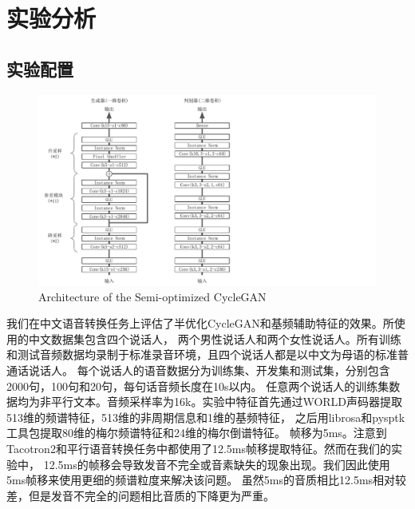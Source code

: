 \section{实验分析}
\subsection{实验配置}

\begin{figure}[!htp]
    \centering
    \includegraphics[width=12cm,trim=0 0 250 0,clip]{figure/4_networks.pdf}
    {Architecture of the Semi-optimized CycleGAN}
    \label{fig:networks}
\end{figure}

我们在中文语音转换任务上评估了半优化CycleGAN和基频辅助特征的效果。所使用的中文数据集包含四个说话人，
两个男性说话人和两个女性说话人。所有训练和测试音频数据均录制于标准录音环境，且四个说话人都是以中文为母语的标准普通话说话人。
每个说话人的语音数据分为训练集、开发集和测试集，分别包含2000句，100句和20句，每句话音频长度在10s以内。
任意两个说话人的训练集数据均为非平行文本。音频采样率为16k。实验中特征首先通过WORLD声码器提取513维的频谱特征，513维的非周期信息和1维的基频特征，
之后用librosa\cite{mcfee2015librosa}和pysptk\cite{yamamoto2019r9y9}工具包提取80维的梅尔频谱特征和24维的梅尔倒谱特征。
帧移为5ms。注意到Tacotron2和平行语音转换任务中都使用了12.5ms帧移提取特征。然而在我们的实验中，
12.5ms的帧移会导致发音不完全或音素缺失的现象出现。我们因此使用5ms帧移来使用更细的频谱粒度来解决该问题。
虽然5ms的音质相比12.5ms相对较差，但是发音不完全的问题相比音质的下降更为严重。

